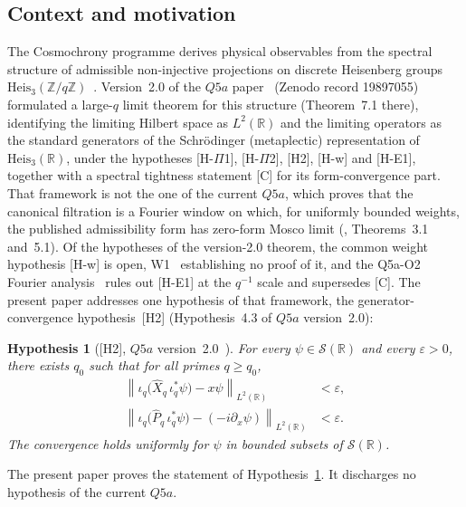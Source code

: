 \documentclass[12pt,a4paper]{article}
\newtheorem{hypothesis}[theorem]{Hypothesis}
\newcommand{\Heis}{\mathrm{Heis}_3}
\newcommand{\Zq}{\mathbb{Z}/q\mathbb{Z}}
\newcommand{\ltwo}{L^2(\mathbb{R})}
\newcommand{\Schwartz}{\mathcal{S}(\mathbb{R})}
\newcommand{\iotaq}{\iota_q}
\newcommand{\iotastar}{\iota_q^*}
\newcommand{\Xhat}{\hat{X}_q}
\newcommand{\Phat}{\hat{P}_q}
\newcommand{\norm}[1]{\left\|#1\right\|}
\begin{document}
    \subsection{Context and motivation}

      The Cosmochrony programme derives physical observables from the spectral structure
      of admissible non-injective projections on discrete Heisenberg groups
      $\Heis(\Zq)$~\cite{Beau2026m,Beau2026HeisenbergStructure}.
      Version~2.0 of the $Q5a$ paper~\cite{Beau2026q5a} (Zenodo record 19897055) formulated a
      large-$q$ limit theorem for this structure (Theorem~7.1 there), identifying the limiting
      Hilbert space as $\ltwo$ and the limiting operators as the standard generators of the
      Schr\"odinger (metaplectic) representation of $\Heis(\mathbb{R})$, under the hypotheses
      [H-$\Pi$1], [H-$\Pi$2], [H2], [H-w] and [H-E1], together with a spectral tightness
      statement [C] for its form-convergence part.
      That framework is not the one of the current $Q5a$, which proves that the canonical
      filtration is a Fourier window on which, for uniformly bounded weights, the published
      admissibility form has zero-form Mosco limit (\cite{Beau2026q5a}, Theorems~3.1 and~5.1).
      Of the hypotheses of the version-2.0 theorem, the common weight hypothesis [H-w] is open,
      W1~\cite{Beau2026w1} establishing no proof of it, and the Q5a-O2 Fourier
      analysis~\cite{Beau2026q5ao2} rules out [H-E1] at the $q^{-1}$ scale and supersedes [C].
      The present paper addresses one hypothesis of that framework, the generator-convergence
      hypothesis~[H2] (Hypothesis~4.3 of $Q5a$ version~2.0):

      \begin{hypothesis}[\textup{[H2]}, $Q5a$ version~2.0~\cite{Beau2026q5a}]
        \label{hyp:H2}
        For every $\psi \in \Schwartz$ and every $\varepsilon > 0$, there exists $q_0$ such that
        for all primes $q \geq q_0$,
        \begin{align*}
          \norm{\iotaq\bigl(\Xhat\,\iotastar\psi\bigr) - x\psi}_{L^2(\mathbb{R})} &< \varepsilon, \\
          \norm{\iotaq\bigl(\Phat\,\iotastar\psi\bigr) - (-i\partial_x\psi)}_{L^2(\mathbb{R})} &< \varepsilon.
        \end{align*}
        The convergence holds uniformly for $\psi$ in bounded subsets of $\Schwartz$.
      \end{hypothesis}

      The present paper proves the statement of Hypothesis~\ref{hyp:H2}.
      It discharges no hypothesis of the current $Q5a$.
\end{document}
